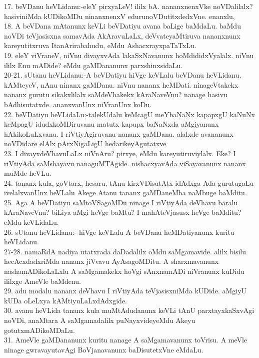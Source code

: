 \documentclass{article}
\begin{document}
17. beVDanu heVLidanu:-eleY pirxyaLeV! ililx bA. nananxnenxVke noVDalilalx? hasiviniMda kUDikoMDu ninanxnenxV edurunoVDutitxdedxVne. enanxlu,\\
18. A beVDana mAtanunx keVLi beVDatiyu avana baLige baMdaLu. baMdu noVDi teVjasisxna samavAda AkAravuLaLx, deVvateyaMtiruva nananxnunx kareyutitxruva ItanArirabahudu, eMdu AshacxrayxpaTaTxLu.\\
19. eleY viVraneV, niVnu divayxvAda lakaSxNavanunx hoMdididxVyalalx. niVnu ililx Enu mADide? eMdu gaMDananunx parxshinxsidaLu.\\
20-21. sUtanu heVLidanu:-A beVDatiyu hiVge keVLalu beVDanu heVLidanu. kAMteyeV, nAnu ninanx gaMDanu. niVnu nananx heMDati. ninageVtakekx nananx gurutu sikakxlilalx saMdeVhakekx kAraNaveVnu? nanage hasivu bAdhisutatxde. ananxvanUnx niVranUnx koDu.\\
22. beVDatiyu heVLidaLu:-talekUdalu keMcagU meYbaNaNx kapapxgU kaNuNx keMpagU idudxkoMDiruvanu matutx kapupx baNaNxda aMgiyanunx hAkikoLuLxvanu. I riVtiyAgiruvanu nananx gaMDanu. alalxde avananunx noVDidare elAlx pArxNigaLigU hedarikeyAgutatxve\\
23. I divayxdeVhavuLaLx niVnAru? pirxye, eMdu kareyutiruviylalx. Eke? I riVtiyAda saMshayavu nanaguMTAgide. nishacxyavAda viSayavanunx nananx muMde heVLu.\\
24. tananx kula, goVtarx, hesaru, tAnu kirxVDisutAtx idAdxga Ada gurutugaLu ivelalxvanUnx heVLalu Akege Atanu tananx gaMDaneMba naMbuge baMditu.\\
25. Aga A beVDatiyu saMtoVSagoMDu ninage I riVtiyAda deVhavu baralu kAraNaveVnu? biLiya aMgi heVge baMtu? I mahAteVjasusx heVge baMditu? eMdu keVLidaLu.\\
26. sUtanu heVLidanu:- hiVge keVLalu A beVDanu heMDatiyanunx kuritu heVLidanu.\\
27-28. namaRdA nadiya utatxrada daDadalilx oMdu saMgamavide. alilx bisilu hecAcxdadxriMda nananx jiVvavu AyAsagoMDitu. A sharxmavanunx nashamADikoLaLxlu A saMgamakekx hoVgi sAnxnamADi niVranunx kuDidu ililxge AmeVle baMdenu.\\
29. adu modalu nananx deVhavu I riVtiyAda teVjasisxniMda kUDide. aMgiyU kUDa oLeLxya kAMtiyuLaLxdAdxgide.\\
30. avanu heVLida tananx kula muMtAdudanunx keVLi tAnU parxtayxkaSxvAgi noVDi, anaMtara A saMgamadalilx puNayxvideyeMdu Akeyu gotutxmADikoMDaLu.\\
31. AmeVle gaMDananunx kuritu nanage A saMgamavanunx toVrisu. A meVle ninage gwravayutavAgi BoVjanavanunx baDisutetxVne eMdaLu.\\
\end{document}
